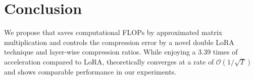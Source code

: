 
\vspace{-1em}
\section{Conclusion}

We propose \celora that saves computational FLOPs by approximated matrix multiplication and controls the compression error by a novel double LoRA technique and layer-wise compression ratios. While enjoying a 3.39 times of acceleration compared to LoRA, \celora theoretically converges at a rate of $\mathcal{O}(1/\sqrt{T})$ and shows comparable performance in our experiments.
